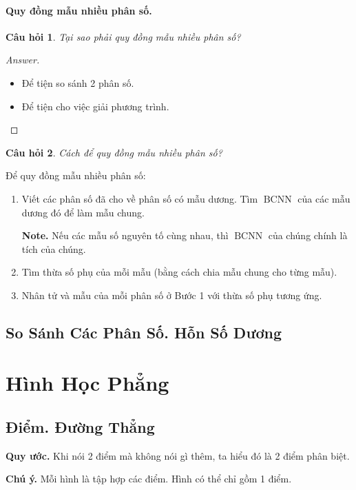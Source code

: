 \documentclass{article}
\numberwithin{equation}{section}
\newtheorem{question}{Câu hỏi}[section]
\begin{document}
\paragraph{Quy đồng mẫu nhiều phân số.}
\begin{question}
	Tại sao phải quy đồng mẫu nhiều phân số?
\end{question}

\begin{proof}[Answer]
	\begin{itemize}
		\item Để tiện so sánh 2 phân số.
		\item Để tiện cho việc giải phương trình.
	\end{itemize}
\end{proof}

\begin{question}
	Cách để quy đồng mẫu nhiều phân số?
\end{question}
Để quy đồng mẫu nhiều phân số:
\begin{enumerate}
	\item Viết các phân số đã cho về phân số có mẫu dương. Tìm $\operatorname{BCNN}$ của các mẫu dương đó để làm mẫu chung.
	
	\textbf{Note.} Nếu các mẫu số nguyên tố cùng nhau, thì $\operatorname{BCNN}$ của chúng chính là tích của chúng.
	\item Tìm thừa số phụ của mỗi mẫu (bằng cách chia mẫu chung cho từng mẫu).
	\item Nhân tử và mẫu của mỗi phân số ở Bước 1 với thừa số phụ tương ứng.
\end{enumerate}

\subsection{So Sánh Các Phân Số. Hỗn Số Dương}

\section{Hình Học Phẳng}

\subsection{Điểm. Đường Thẳng}
\textbf{Quy ước.} Khi nói 2 điểm mà không nói gì thêm, ta hiểu đó là 2 điểm phân biệt.

\noindent\textbf{Chú ý.} Mỗi hình là tập hợp các điểm. Hình có thể chỉ gồm 1 điểm.
\end{document}

